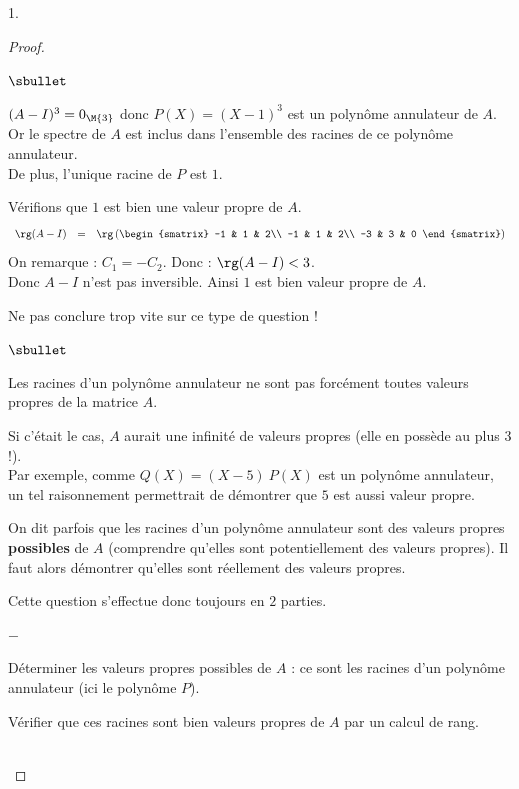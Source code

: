 \documentclass[11pt]{article}%
\begin{document}
\begin{noliste}{1.}
\begin{proof}~
\begin{noliste}{$\sbullet$}
\item $(A-I)^3=0_{\M{3}}$ donc $P(X)=(X-1)^3$ est un polynôme 
annulateur de $A$.\\
Or le spectre de $A$ est inclus dans l'ensemble des racines de ce 
polynôme 
annulateur.\\
De plus, l'unique racine de $P$ est $1$. 
\item Vérifions que $1$ est bien une valeur propre de $A$.
\[
\begin{array}{rcl}
  \rg(A-I) & = & \rg \left( 
    \begin{smatrix} 
      -1 & 1 & 2\\ 
      -1 & 1 & 2\\ 
      -3 & 3 & 0
    \end{smatrix} \right)
\end{array}
\]
On remarque : $C_1=-C_2$. Donc : $\rg(A-I)<3$.\\
Donc $A-I$ n'est pas inversible. Ainsi $1$ est bien valeur propre de
$A$.%
\end{noliste}

\begin{remark}%
  Ne pas conclure trop vite sur ce type de question !
  \begin{noliste}{$\sbullet$}
  \item Les racines d'un polynôme annulateur ne sont pas forcément
    toutes valeurs propres de la matrice $A$.
  \item Si c'était le cas, $A$ aurait une infinité de valeurs
    propres (elle en possède au plus $3$ !). \\
    Par exemple, comme $Q(X) = (X-5) \ P(X)$ est un polynôme annulateur,
    un tel raisonnement permettrait de démontrer que $5$ est aussi
    valeur propre.
  \item On dit parfois que les racines d'un polynôme
    annulateur sont des valeurs propres {\bf possibles} de $A$
    (comprendre qu'elles sont potentiellement des valeurs
    propres). Il faut alors démontrer qu'elles sont réellement
    des valeurs propres.
  \item Cette question s'effectue donc toujours en $2$ parties.
    \begin{noliste}{$-$}
    \item Déterminer les valeurs propres possibles de $A$ : ce sont les 
      racines d'un polynôme annulateur (ici le polynôme $P$).
    \item Vérifier que ces racines sont bien valeurs propres de $A$ par un
      calcul de rang.
    \end{noliste}
  \end{noliste}
\end{remark}~\\[-1.4cm]
\end{proof}


\end{noliste}
\end{document}
